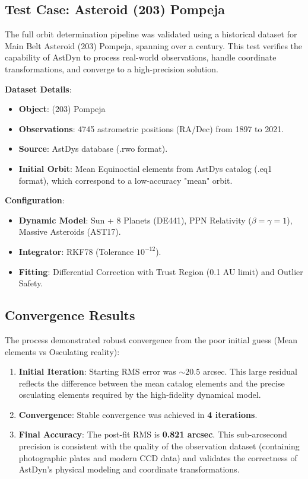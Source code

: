 \subsection{Test Case: Asteroid (203) Pompeja}

The full orbit determination pipeline was validated using a historical dataset for Main Belt Asteroid (203) Pompeja, spanning over a century. This test verifies the capability of AstDyn to process real-world observations, handle coordinate transformations, and converge to a high-precision solution.

\textbf{Dataset Details}:
\begin{itemize}
    \item \textbf{Object}: (203) Pompeja
    \item \textbf{Observations}: 4745 astrometric positions (RA/Dec) from 1897 to 2021.
    \item \textbf{Source}: AstDys database (.rwo format).
    \item \textbf{Initial Orbit}: Mean Equinoctial elements from AstDys catalog (.eq1 format), which correspond to a low-accuracy "mean" orbit.
\end{itemize}

\textbf{Configuration}:
\begin{itemize}
    \item \textbf{Dynamic Model}: Sun + 8 Planets (DE441), PPN Relativity ($\beta=\gamma=1$), Massive Asteroids (AST17).
    \item \textbf{Integrator}: RKF78 (Tolerance $10^{-12}$).
    \item \textbf{Fitting}: Differential Correction with Trust Region (0.1 AU limit) and Outlier Safety.
\end{itemize}

\subsection{Convergence Results}

The process demonstrated robust convergence from the poor initial guess (Mean elements vs Osculating reality):

\begin{enumerate}
    \item \textbf{Initial Iteration}: Starting RMS error was $\sim 20.5$ arcsec. This large residual reflects the difference between the mean catalog elements and the precise osculating elements required by the high-fidelity dynamical model.
    \item \textbf{Convergence}: Stable convergence was achieved in \textbf{4 iterations}.
    \item \textbf{Final Accuracy}: The post-fit RMS is \textbf{0.821 arcsec}. This sub-arcsecond precision is consistent with the quality of the observation dataset (containing photographic plates and modern CCD data) and validates the correctness of AstDyn's physical modeling and coordinate transformations.
\end{enumerate}

